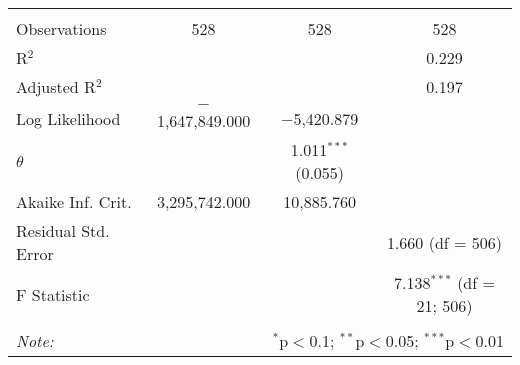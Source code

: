 \begin{table}[!htbp]
\begin{tabular}{@{\extracolsep{5pt}}lccc}
 \hline \\[-1.8ex] 
Observations & 528 & 528 & 528 \\ 
R$^{2}$ &  &  & 0.229 \\ 
Adjusted R$^{2}$ &  &  & 0.197 \\ 
Log Likelihood & $-$1,647,849.000 & $-$5,420.879 &  \\ 
$\theta$ &  & 1.011$^{***}$  (0.055) &  \\ 
Akaike Inf. Crit. & 3,295,742.000 & 10,885.760 &  \\ 
Residual Std. Error &  &  & 1.660 (df = 506) \\ 
F Statistic &  &  & 7.138$^{***}$ (df = 21; 506) \\ 
\hline 
\hline \\[-1.8ex] 
\textit{Note:}  & \multicolumn{3}{r}{$^{*}$p$<$0.1; $^{**}$p$<$0.05; $^{***}$p$<$0.01} \\ 
\end{tabular} 
\end{table} 
